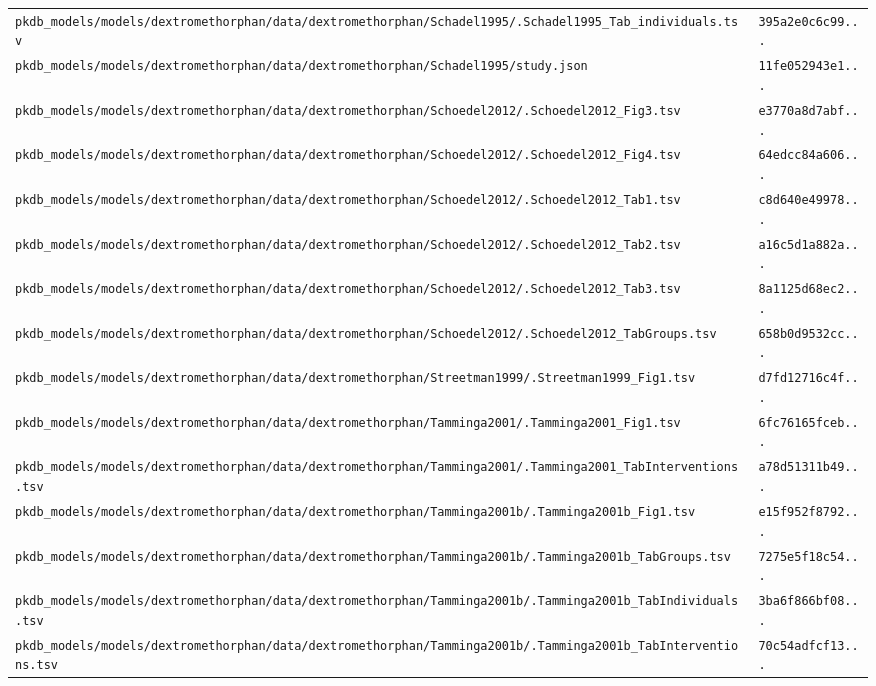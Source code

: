 \begin{longtable}{ll}
\texttt{pkdb\_models/models/dextromethorphan/data/dextromethorphan/Schadel1995/.Schadel1995\_Tab\_individuals.tsv} & \texttt{395a2e0c6c99...} \\
\texttt{pkdb\_models/models/dextromethorphan/data/dextromethorphan/Schadel1995/study.json} & \texttt{11fe052943e1...} \\
\texttt{pkdb\_models/models/dextromethorphan/data/dextromethorphan/Schoedel2012/.Schoedel2012\_Fig3.tsv} & \texttt{e3770a8d7abf...} \\
\texttt{pkdb\_models/models/dextromethorphan/data/dextromethorphan/Schoedel2012/.Schoedel2012\_Fig4.tsv} & \texttt{64edcc84a606...} \\
\texttt{pkdb\_models/models/dextromethorphan/data/dextromethorphan/Schoedel2012/.Schoedel2012\_Tab1.tsv} & \texttt{c8d640e49978...} \\
\texttt{pkdb\_models/models/dextromethorphan/data/dextromethorphan/Schoedel2012/.Schoedel2012\_Tab2.tsv} & \texttt{a16c5d1a882a...} \\
\texttt{pkdb\_models/models/dextromethorphan/data/dextromethorphan/Schoedel2012/.Schoedel2012\_Tab3.tsv} & \texttt{8a1125d68ec2...} \\
\texttt{pkdb\_models/models/dextromethorphan/data/dextromethorphan/Schoedel2012/.Schoedel2012\_TabGroups.tsv} & \texttt{658b0d9532cc...} \\
\texttt{pkdb\_models/models/dextromethorphan/data/dextromethorphan/Streetman1999/.Streetman1999\_Fig1.tsv} & \texttt{d7fd12716c4f...} \\
\texttt{pkdb\_models/models/dextromethorphan/data/dextromethorphan/Tamminga2001/.Tamminga2001\_Fig1.tsv} & \texttt{6fc76165fceb...} \\
\texttt{pkdb\_models/models/dextromethorphan/data/dextromethorphan/Tamminga2001/.Tamminga2001\_TabInterventions.tsv} & \texttt{a78d51311b49...} \\
\texttt{pkdb\_models/models/dextromethorphan/data/dextromethorphan/Tamminga2001b/.Tamminga2001b\_Fig1.tsv} & \texttt{e15f952f8792...} \\
\texttt{pkdb\_models/models/dextromethorphan/data/dextromethorphan/Tamminga2001b/.Tamminga2001b\_TabGroups.tsv} & \texttt{7275e5f18c54...} \\
\texttt{pkdb\_models/models/dextromethorphan/data/dextromethorphan/Tamminga2001b/.Tamminga2001b\_TabIndividuals.tsv} & \texttt{3ba6f866bf08...} \\
\texttt{pkdb\_models/models/dextromethorphan/data/dextromethorphan/Tamminga2001b/.Tamminga2001b\_TabInterventions.tsv} & \texttt{70c54adfcf13...} \\

\end{longtable}
